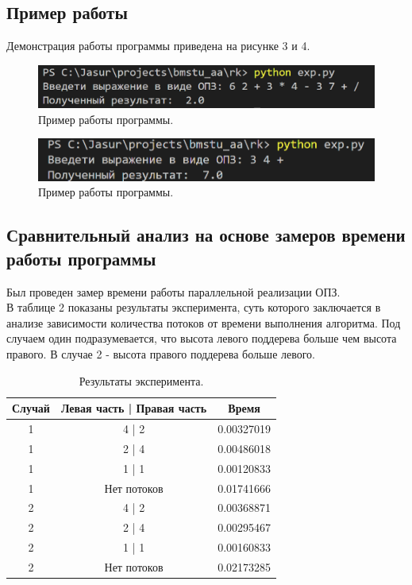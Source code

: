 \documentclass[a4paper, 12pt]{article}
\begin{document}
	\subsection{Пример работы}
	\hspace*{5mm} Демонстрация работы программы приведена на рисунке 3 и 4.
	\begin{figure}[h]
		\centering \includegraphics[scale=0.9]{r1}
		\centering\caption{Пример работы программы.}
	\end{figure}
\begin{figure}[h]
	\centering \includegraphics[scale=0.9]{r2}
	\centering\caption{Пример работы программы.}
\end{figure}
	\clearpage
	\newpage
	\subsection{Сравнительный анализ на основе замеров времени работы программы}
	Был проведен замер времени работы параллельной реализации ОПЗ. 
	\\ \hspace*{5mm} В таблице 2 показаны результаты эксперимента, суть которого заключается в анализе зависимости количества потоков от времени выполнения алгоритма. Под случаем один подразумевается, что высота левого поддерева больше чем высота правого. В случае 2 - высота правого поддерева больше левого.  
	\begin{table}[h]
		\centering
		\caption{Результаты эксперимента.\\}
		\begin{tabular}{ | c | c | c |}
			\hline
			Случай & Левая часть | Правая часть & Время   \\ \hline
			1 & 4 | 2 & 0.00327019 \\ \hline
			1 & 2 | 4 & 0.00486018 \\ \hline
			1 & 1 | 1 & 0.00120833 \\ \hline
			1 & Нет потоков & 0.01741666 \\ \hline
			2 & 4 | 2 & 0.00368871 \\ \hline
			2 & 2 | 4 & 0.00295467 \\ \hline
			2 & 1 | 1 & 0.00160833 \\ \hline
			2 & Нет потоков & 0.02173285 \\ \hline
		\end{tabular}
	\end{table}
	
\end{document}
